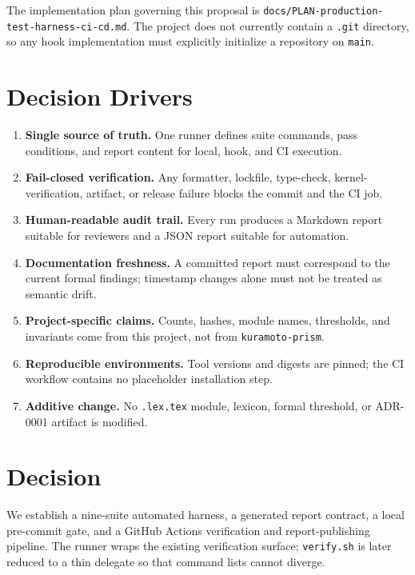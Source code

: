 \documentclass[11pt]{article}
\begin{document}
The implementation plan governing this proposal is
\texttt{docs/PLAN-production-test-harness-ci-cd.md}. The project does not currently contain a
\texttt{.git} directory, so any hook implementation must explicitly initialize a repository on
\texttt{main}.

\section{Decision Drivers}

\begin{enumerate}
  \item \textbf{Single source of truth.} One runner defines suite commands, pass conditions, and
        report content for local, hook, and CI execution.
  \item \textbf{Fail-closed verification.} Any formatter, lockfile, type-check, kernel-verification,
        artifact, or release failure blocks the commit and the CI job.
  \item \textbf{Human-readable audit trail.} Every run produces a Markdown report suitable for
        reviewers and a JSON report suitable for automation.
  \item \textbf{Documentation freshness.} A committed report must correspond to the current formal
        findings; timestamp changes alone must not be treated as semantic drift.
  \item \textbf{Project-specific claims.} Counts, hashes, module names, thresholds, and invariants
        come from this project, not from \texttt{kuramoto-prism}.
  \item \textbf{Reproducible environments.} Tool versions and digests are pinned; the CI workflow
        contains no placeholder installation step.
  \item \textbf{Additive change.} No \texttt{.lex.tex} module, lexicon, formal threshold, or
        ADR-0001 artifact is modified.
\end{enumerate}

\section{Decision}

We establish a nine-suite automated harness, a generated report contract, a local pre-commit gate,
and a GitHub Actions verification and report-publishing pipeline. The runner wraps the existing
verification surface; \texttt{verify.sh} is later reduced to a thin delegate so that command lists
cannot diverge.
\end{document}
